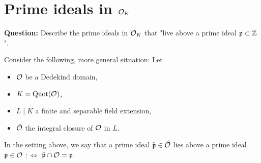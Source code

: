 
\section{Prime ideals in $\mathcal{O}_K$}

\textbf{Question:} Describe the prime ideals in $\mathcal{O}_K$ that "live above a prime ideal $\mathfrak{p} \subset \mathbb{Z}$".

Consider the following, more general situation:
Let
\begin{itemize}
	\item $\mathcal{O}$ be a Dedekind domain,
	\item $K = \operatorname{Quot}(\mathcal{O})$,
	\item $L \mid K$ a finite and separable field extension,
	\item $\hat{\mathcal{O}}$ the integral closure of $\mathcal{O}$ in $L$.
\end{itemize}

\begin{defi}
	In the setting above, we say that a prime ideal $\hat{\mathfrak{p}} \in \hat{\mathcal{O}}$ lies above a prime ideal $\mathfrak{p} \in \mathcal{O}$ $:\Leftrightarrow$ $\hat{\mathfrak{p}} \cap \mathcal{O} = \mathfrak{p}$.
\end{defi}

